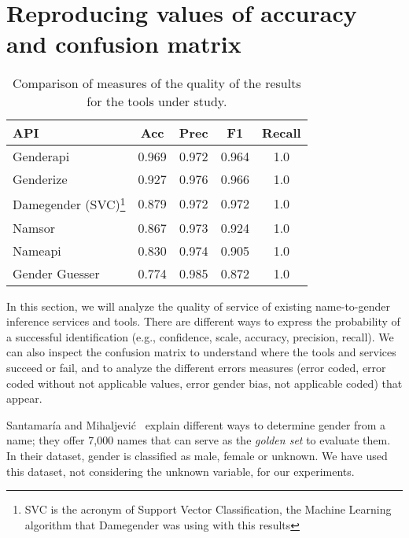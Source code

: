 \documentclass[a4paper]{article}
\begin{document}
\section{Reproducing values of accuracy and confusion matrix}
\label{sec:reproducing}

\begin{table}[t]
\footnotesize
\begin{tabular}[]{lcccc}
  \hline
  API & Acc & Prec & F1 & Recall\tabularnewline
\hline
Genderapi & 0.969 & 0.972 & 0.964 & 1.0\tabularnewline
Genderize & 0.927 & 0.976 & 0.966 & 1.0\tabularnewline
Damegender (SVC)\footnote{SVC is the acronym of Support Vector Classification, the Machine Learning algorithm that Damegender was using with this results} & 0.879 & 0.972 & 0.972 & 1.0\tabularnewline
Namsor & 0.867 & 0.973 & 0.924 & 1.0\tabularnewline
Nameapi & 0.830 & 0.974 & 0.905 & 1.0\tabularnewline
Gender Guesser & 0.774 & 0.985 & 0.872 & 1.0\tabularnewline
\hline
\end{tabular}
\caption{Comparison of measures of the quality of the results for the tools under study.}
\label{table:DifferentAccuraciesMeasures}
\end{table}

In this section, we will analyze the quality of service of existing name-to-gender inference services and tools.
There are different ways to express the probability of a successful identification (e.g., confidence, scale, accuracy, precision, recall).
We can also inspect the confusion matrix to understand where the tools and services succeed or fail, and to analyze the different errors measures (error coded, error coded without not applicable values, error gender bias, not applicable coded) that appear.

Santamaría and Mihaljevi\'c~\cite{10.7717/peerj-cs.156} explain different ways to determine gender from a name; they offer 7,000 names that can serve as the \emph{golden set} to evaluate them. 
In their dataset, gender is classified as male, female or unknown. 
We have used this dataset, not considering the unknown variable, for our experiments.
\end{document}
